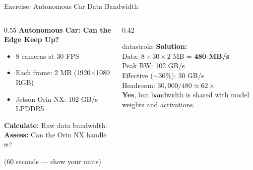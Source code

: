\documentclass[aspectratio=169, 12pt]{beamer}
\begin{document}
\begin{frame}{Exercise: Autonomous Car Data Bandwidth}
\note{
%
%
%
%
}

\small
\begin{columns}[T]
  \begin{column}{0.55\textwidth}
    {\normalsize\bfseries Autonomous Car: Can the Edge Keep Up?}

    \vspace{0.2cm}
    \begin{itemize}\setlength\itemsep{0pt}
      \item 8 cameras at 30 FPS
      \item Each frame: 2 MB (1920$\times$1080 RGB)
      \item Jetson Orin NX: 102 GB/s LPDDR5
    \end{itemize}

    \vspace{0.15cm}
    \textbf{Calculate:} Raw data bandwidth.\\
    \textbf{Assess:} Can the Orin NX handle it?

    {\footnotesize\textcolor{midgray}{(60 seconds --- show your units)}}
  \end{column}
  \begin{column}{0.42\textwidth}
    \pause
    \begin{mlsyscard}{datastroke}
    \textbf{Solution:}\\[0.1cm]
    {\footnotesize
    Data: $8 \times 30 \times 2$ MB = \textbf{480 MB/s}\\[0.05cm]
    Peak BW: 102 GB/s\\
    Effective ($\sim$30\%): 30 GB/s\\[0.1cm]
    Headroom: $30{,}000/480 \approx 62\times$\\[0.1cm]
    \textcolor{datastroke}{\textbf{Yes}}, but bandwidth is shared with model weights and activations.
    }
    \end{mlsyscard}
  \end{column}
\end{columns}


\end{frame}
\end{document}

